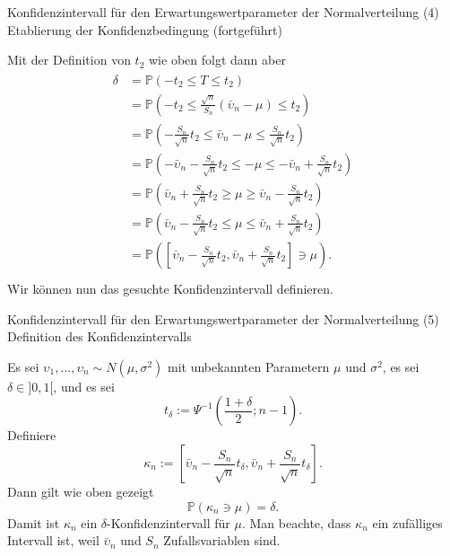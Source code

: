 \documentclass[
  8pt,
  ignorenonframetext,
]{beamer}
\newcommand{\ups} {\upsilon}
\begin{document}
\begin{frame}{Konfidenzintervall für den Erwartungswertparameter der
Normalverteilung}
\protect\hypertarget{konfidenzintervall-fuxfcr-den-erwartungswertparameter-der-normalverteilung-4}{}
\noindent (4) Etablierung der Konfidenzbedingung (fortgeführt)

\small

Mit der Definition von \(t_2\) wie oben folgt dann aber \footnotesize
\begin{align}
\begin{split}
\delta
& =
\mathbb{P}\left(-t_2 \le T \le t_2 \right)                                                                          \\
& =
\mathbb{P}\left(-t_2 \le \frac{\sqrt{n}}{S_n}(\bar{\ups}_n - \mu) \le t_2 \right)                                       \\
& =
\mathbb{P}\left(-\frac{S_n}{\sqrt{n}}t_2 \le \bar{\ups}_n - \mu \le \frac{S_n}{\sqrt{n}}t_2 \right)                     \\
& =
\mathbb{P}\left(-\bar{\ups}_n -\frac{S_n}{\sqrt{n}}t_2 \le - \mu \le - \bar{\ups}_n + \frac{S_n}{\sqrt{n}}t_2 \right)   \\
& =
\mathbb{P}\left(\bar{\ups}_n + \frac{S_n}{\sqrt{n}}t_2 \ge \mu \ge \bar{\ups}_n - \frac{S_n}{\sqrt{n}}t_2 \right)       \\
& =
\mathbb{P}\left(\bar{\ups}_n - \frac{S_n}{\sqrt{n}}t_2 \le \mu \le \bar{\ups}_n + \frac{S_n}{\sqrt{n}}t_2 \right)       \\
& =
\mathbb{P}\left(\left[\bar{\ups}_n - \frac{S_n}{\sqrt{n}}t_2, \bar{\ups}_n + \frac{S_n}{\sqrt{n}}t_2\right] \ni \mu \right).        \\
\end{split}
\end{align} \small Wir können nun das gesuchte Konfidenzintervall
definieren.
\end{frame}

\begin{frame}{Konfidenzintervall für den Erwartungswertparameter der
Normalverteilung}
\protect\hypertarget{konfidenzintervall-fuxfcr-den-erwartungswertparameter-der-normalverteilung-5}{}
\noindent(5) Definition des Konfidenzintervalls \small

Es sei \(\ups_1,...,\ups_n \sim N(\mu,\sigma^2)\) mit unbekannten
Parametern \(\mu\) und \(\sigma^2\), es sei \(\delta \in ]0,1[\), und es
sei \begin{equation}
t_\delta := \Psi^{-1}\left(\frac{1+\delta}{2}; n - 1\right).
\end{equation} Definiere \begin{equation}
\kappa_n :=
\left[\bar{\ups}_n - \frac{S_n}{\sqrt{n}}t_\delta,
\bar{\ups}_n + \frac{S_n}{\sqrt{n}}t_\delta\right].
\end{equation} Dann gilt wie oben gezeigt \begin{equation}
\mathbb{P}(\kappa_n \ni \mu) = \delta.
\end{equation} Damit ist \(\kappa_n\) ein \(\delta\)-Konfidenzintervall
für \(\mu\). Man beachte, dass \(\kappa_n\) ein zufälliges Intervall
ist, weil \(\bar{\ups}_n\) und \(S_n\) Zufallsvariablen sind.
\end{frame}
\end{document}
